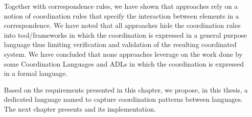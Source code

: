 Together with correspondence rules, we have shown that approaches rely on a notion of coordination rules that specify the interaction between elements in a correspondence. We have noted that all approaches hide the coordination rules into tool/frameworks in which the coordination is expressed in a general purpose language thus limiting verification and validation of the resulting coordinated system. We have concluded that none approaches leverage on the work done by some Coordination Languages and ADLs in which the coordination is expressed in a formal language.  

Based on the requirements presented in this chapter, we propose, in this thesis, a dedicated language named \bcool to capture coordination patterns between languages. The next chapter presents \bcool and its implementation.




